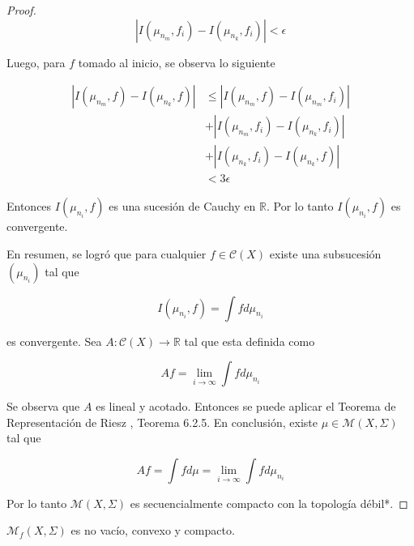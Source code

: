 \begin{proof}
	\begin{equation}
		|I(\mu_{n_m},f_i) - I(\mu_{n_k},f_i)| < \epsilon
	\end{equation}
	
	Luego, para $f$ tomado al inicio, se observa lo siguiente
	
	\begin{align}
		|I(\mu_{n_m},f) - I(\mu_{n_k},f)| &\leq |I(\mu_{n_m},f) - I(\mu_{n_m},f_i) | \\
		& + |I(\mu_{n_m},f_i) - I(\mu_{n_k},f_i)| \\		
		& + |I(\mu_{n_k},f_i) - I(\mu_{n_k},f)|\\
		& < 3\epsilon
	\end{align}
	
	Entonces $I(\mu_{n_i},f)$ es una sucesión de Cauchy en $\mathbb{R}$. Por lo tanto $I(\mu_{n_i},f)$ es convergente.
	
	En resumen, se logró que para cualquier $f \in \mathcal{C}(X)$ existe una subsucesión $(\mu_{n_i})$ tal que
	
	\begin{equation}
		I(\mu_{n_i},f) = \int f d\mu_{n_i}
	\end{equation}
	
	es convergente. Sea $A: \mathcal{C}(X) \rightarrow \mathbb{R}$ tal que esta definida como
	
	\begin{equation}
		Af = \lim_{i \rightarrow \infty} \int f d \mu_{n_i}
	\end{equation}
	
	Se observa que $A$ es lineal y acotado. Entonces se puede aplicar el Teorema de Representación de Riesz \cite{riesz}, Teorema 6.2.5. En conclusión, existe $\mu \in \mathcal{M}(X,\Sigma)$ tal que
	
	\begin{equation}
		Af = \int f d\mu = \lim_{i \rightarrow \infty} \int f d \mu_{n_i}
	\end{equation}
	
	Por lo tanto $\mathcal{M}(X,\Sigma)$ es secuencialmente compacto con la topología débil*.
\end{proof}

\begin{teorema}\label{krylov-bugoliubov}
	$\mathcal{M}_f(X,\Sigma)$ es no vacío, convexo y compacto.
\end{teorema}

